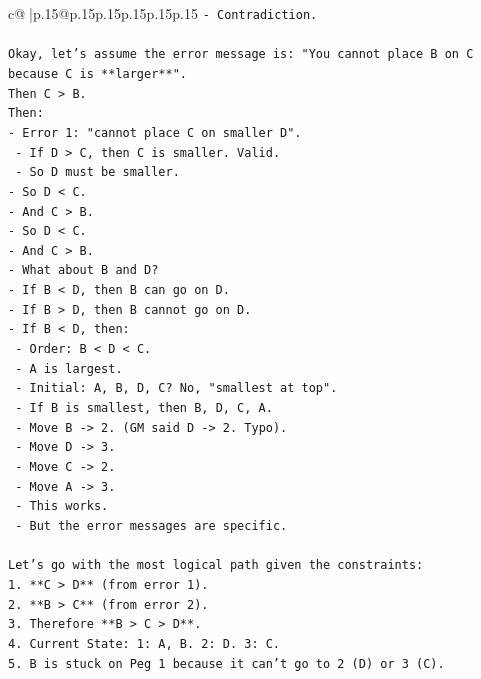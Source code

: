 \documentclass{article}
\begin{document}
{\begin{supertabular}{c@{$\;$}|p{.15\linewidth}@{}p{.15\linewidth}p{.15\linewidth}p{.15\linewidth}p{.15\linewidth}p{.15\linewidth}}
{{{\texttt{{-} Contradiction.} \\
\\ 
\texttt{Okay, let's assume the error message is: "You cannot place B on C because C is **larger**".} \\
\texttt{Then C > B.} \\
\texttt{Then:} \\
\texttt{{-} Error 1: "cannot place C on smaller D".} \\
\texttt{    {-} If D > C, then C is smaller. Valid.} \\
\texttt{    {-} So D must be smaller.} \\
\texttt{{-} So D < C.} \\
\texttt{{-} And C > B.} \\
\texttt{{-} So D < C.} \\
\texttt{{-} And C > B.} \\
\texttt{{-} What about B and D?} \\
\texttt{{-} If B < D, then B can go on D.} \\
\texttt{{-} If B > D, then B cannot go on D.} \\
\texttt{{-} If B < D, then:} \\
\texttt{    {-} Order: B < D < C.} \\
\texttt{    {-} A is largest.} \\
\texttt{    {-} Initial: A, B, D, C? No, "smallest at top".} \\
\texttt{    {-} If B is smallest, then B, D, C, A.} \\
\texttt{    {-} Move B {-}> 2. (GM said D {-}> 2. Typo).} \\
\texttt{    {-} Move D {-}> 3.} \\
\texttt{    {-} Move C {-}> 2.} \\
\texttt{    {-} Move A {-}> 3.} \\
\texttt{    {-} This works.} \\
\texttt{    {-} But the error messages are specific.} \\
\\ 
\texttt{Let's go with the most logical path given the constraints:} \\
\texttt{1. **C > D** (from error 1).} \\
\texttt{2. **B > C** (from error 2).} \\
\texttt{3. Therefore **B > C > D**.} \\
\texttt{4. Current State: 1: A, B. 2: D. 3: C.} \\
\texttt{5. B is stuck on Peg 1 because it can't go to 2 (D) or 3 (C).} \\
}}}
\end{supertabular}}
\end{document}
